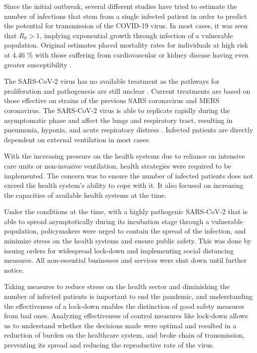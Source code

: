 \documentclass[final,authoryear,5p,times,twocolumn]{elsarticle}
\begin{document}
	Since the initial outbreak, several different studies have tried to estimate the number of infections \cite{GN2020} that stem from a single infected patient in order to predict the potential for transmission of the COVID-19 virus. In most cases, it was seen that $R_0 > 1$, implying exponential growth through infection of a vulnerable population. Original estimates placed mortality rates for individuals at high risk at  4.46 \% with those suffering from cardiovascular or kidney disease having even greater susceptibility \cite{BPH2020}. 
	
	The SARS-CoV-2 virus has no available treatment as the pathways for proliferation and pathogenesis are still unclear \cite{RIS2020}.  Current treatments are based on those effective on strains of the previous SARS coronavirus and MERS coronavirus. The SARS-CoV-2  virus is able to replicate rapidly during the asymptomatic phase and affect the lungs and respiratory tract, resulting in pneumonia, hypoxia, and acute respiratory distress \cite{PSL2020}. Infected patients are directly dependent on external ventilation in most cases. 
	
	With the increasing pressure on the health systems due to reliance on intensive care units or non-invasive ventilation, health strategies were required to be implemented. The concern was to ensure the number of infected patients does not exceed the health system’s ability to cope with it. It also focused on increasing the capacities of available health systems at the time.
	
	Under the conditions at the time, with a highly pathogenic SARS-CoV-2 that is able to spread asymptotically during its incubation stage through a vulnerable population, policymakers were urged to contain the spread of the infection, and minimize stress on the health systems and ensure public safety. This was done by issuing orders for widespread lock-down and implementing social distancing measures. All non-essential businesses and services were shut down until further notice. 
	
	Taking measures to reduce stress on the health sector and diminishing the number of infected patients is important to end the pandemic, and understanding the effectiveness of a lock-down enables the distinction of good safety measures from bad ones. Analyzing effectiveness of control measures like lock-down allows us to understand whether the decisions made were optimal and resulted in a reduction of burden on the healthcare system, and broke chain of transmission, preventing its spread and reducing the reproductive rate of the virus.
	
\end{document}

